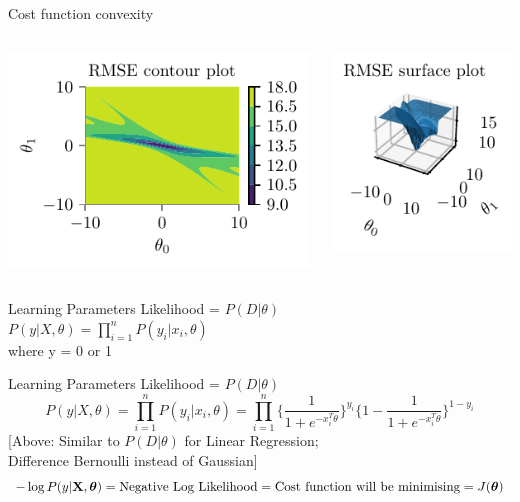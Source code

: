 \documentclass{beamer}
\begin{document}
\begin{frame}{Cost function convexity}
\begin{columns}
	\begin{column}{0.5\textwidth}
		\includegraphics[scale=0.7]{../assets/logistic-regression/figures/logistic-sse-loss-contour.pdf}
	\end{column}
\begin{column}{0.5\textwidth}
	\includegraphics[scale=0.7]{../assets/logistic-regression/figures/logistic-sse-loss-3d.pdf}
\end{column}
\end{columns}
\end{frame}

\begin{frame}{Learning Parameters}
Likelihood = $P(D | \theta)$ \\
\vspace{0.2cm}
$P(y | X, \theta) = \prod_{i=1}^{n} P(y_{i} | x_{i}, \theta)$ \\ where y = 0 or 1
\end{frame}
\begin{frame}{Learning Parameters}
Likelihood = $P(D | \theta)$ \\
\vspace{-0.4cm}
\[
P(y | X, \theta) = \prod_{i=1}^{n} P(y_{i} | x_{i}, \theta) = \prod_{i=1}^{n} \Big\{\frac{1}{1 + e^{-x_{i}^{T}\theta}}\Big\}^{y_{i}}\Big\{1 - \frac{1}{1 + e^{-x_{i}^{T}\theta}}\Big\}^{1 - y_{i}}
\]
\vspace{0.2cm}
[Above: Similar to $P(D|\theta)$ for Linear Regression; \\
\hspace{1.3cm} Difference Bernoulli instead of Gaussian]\\
\[
-\log P(y | \mathbf{X}, \boldsymbol{\theta}) = \text{Negative Log Likelihood} = \text{Cost function will be minimising} = J(\boldsymbol{\theta})
\]
\end{frame}
\end{document}
